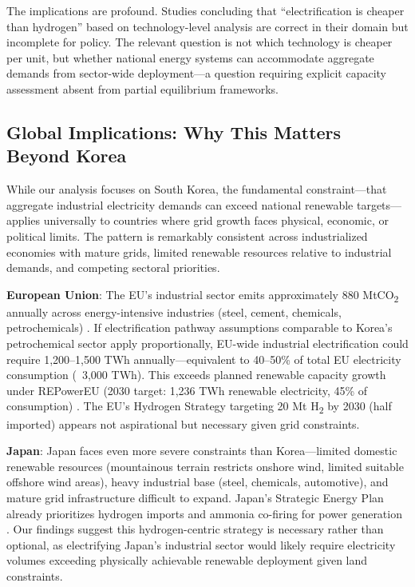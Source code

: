 \documentclass[11pt,a4paper]{article}
\begin{document}
The implications are profound. Studies concluding that ``electrification is cheaper than hydrogen'' based on technology-level analysis \citep{Diesing2025,Leicher2023} are correct in their domain but incomplete for policy. The relevant question is not which technology is cheaper per unit, but whether national energy systems can accommodate aggregate demands from sector-wide deployment---a question requiring explicit capacity assessment absent from partial equilibrium frameworks.

\subsection{Global Implications: Why This Matters Beyond Korea}

While our analysis focuses on South Korea, the fundamental constraint---that aggregate industrial electricity demands can exceed national renewable targets---applies universally to countries where grid growth faces physical, economic, or political limits. The pattern is remarkably consistent across industrialized economies with mature grids, limited renewable resources relative to industrial demands, and competing sectoral priorities.

\textbf{European Union}: The EU's industrial sector emits approximately 880 MtCO\textsubscript{2} annually across energy-intensive industries (steel, cement, chemicals, petrochemicals) \citep{MaterialEconomics2019}. If electrification pathway assumptions comparable to Korea's petrochemical sector apply proportionally, EU-wide industrial electrification could require 1,200--1,500 TWh annually---equivalent to 40--50\% of total EU electricity consumption (~3,000 TWh). This exceeds planned renewable capacity growth under REPowerEU (2030 target: 1,236 TWh renewable electricity, 45\% of consumption) \citep{EUREPowerEU2022}. The EU's Hydrogen Strategy targeting 20 Mt H\textsubscript{2} by 2030 (half imported) appears not aspirational but necessary given grid constraints.

\textbf{Japan}: Japan faces even more severe constraints than Korea---limited domestic renewable resources (mountainous terrain restricts onshore wind, limited suitable offshore wind areas), heavy industrial base (steel, chemicals, automotive), and mature grid infrastructure difficult to expand. Japan's Strategic Energy Plan already prioritizes hydrogen imports and ammonia co-firing for power generation \citep{JapanMETI2021}. Our findings suggest this hydrogen-centric strategy is necessary rather than optional, as electrifying Japan's industrial sector would likely require electricity volumes exceeding physically achievable renewable deployment given land constraints.
\end{document}

